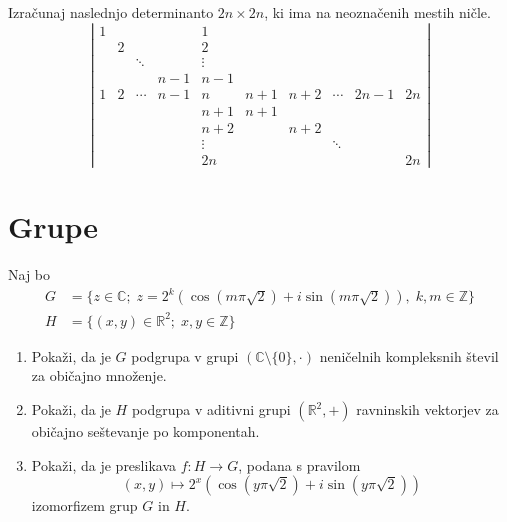 \documentclass[a4paper,12pt]{article}
\begin{document}
Izračunaj naslednjo determinanto \(2n \times 2n\), ki ima na neoznačenih mestih ničle.
\[
\left|
\begin{array}{cccccccccc}
1 &   &   &   & 1   &   &   &   &   &   \\
  & 2 &   &   & 2   &   &   &   &   &   \\
  &   & \ddots & & \vdots & & & & & \\
  &   &   & n-1 & n-1 & & & & & \\
1 & 2 & \cdots & n-1 & n & n+1 & n+2 & \cdots & 2n-1 & 2n \\
  &   &   &   & n+1 & n+1 &   &   &   &   \\
  &   &   &   & n+2 &   & n+2 &   &   &   \\
  &   &   &   & \vdots &   &   & \ddots &   &   \\
  &   &   &   & 2n &   &   &   &   & 2n
\end{array}
\right|
\]
%
%

\section*{Grupe}

Naj bo
\begin{align*}
G &= \{z \in \mathbb{C};\; z = 2^k(\cos(m\pi\sqrt{2}) + i\sin(m\pi\sqrt{2})),\; k,m \in \mathbb{Z}\} \\
H &= \{(x,y) \in \mathbb{R}^2;\; x,y \in \mathbb{Z}\}
\end{align*}
\begin{enumerate}
\item
Pokaži, da je \(G\) podgrupa v grupi \((\mathbb{C} \setminus \{0\}, \cdot)\)
neničelnih kompleksnih števil za običajno množenje.

\item
Pokaži, da je \(H\) podgrupa v aditivni grupi \((\mathbb{R}^2, +)\)
ravninskih vektorjev za običajno seštevanje po komponentah.

\item
Pokaži, da je preslikava \(f:H\to G\), podana s pravilom
\[
(x,y) \mapsto 2^x(\cos(y\pi\sqrt{2}) + i\sin(y\pi\sqrt{2}))
\]
izomorfizem grup \(G\) in \(H\).
\end{enumerate}
\end{document}
